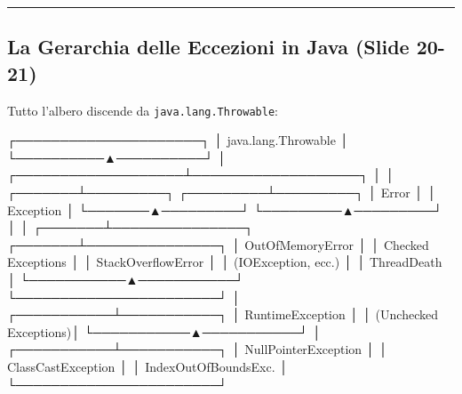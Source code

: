 \documentclass[11pt,a4paper,oneside]{report}
\newcommand{\passthrough}[1]{#1}
\begin{document}
\begin{center}\rule{0.5\linewidth}{0.5pt}\end{center}

\subsection{La Gerarchia delle Eccezioni in Java (Slide
20-21)}\label{chap16_la-gerarchia-delle-eccezioni-in-java-slide-20-21}

Tutto l'albero discende da
\passthrough{\lstinline!java.lang.Throwable!}:

\needspace{7cm}
\begin{asciibox}
                 ┌─────────────────────┐
                 │ java.lang.Throwable │
                 └──────────▲──────────┘
                            │
        ┌───────────────────┴───────────────────┐
        │                                       │
┌───────┴─────────┐                   ┌─────────┴─────────┐
│      Error      │                   │     Exception     │
└───────▲─────────┘                   └─────────▲─────────┘
        │                                       │
┌───────┴───────────────┐               ┌───────┴───────────────┐
│  OutOfMemoryError     │               │  Checked Exceptions   │
│  StackOverflowError   │               │ (IOException, ecc.)   │
│  ThreadDeath          │               └───────────▲───────────┘
└───────────────────────┘                           │
                                        ┌───────────┴───────────┐
                                        │   RuntimeException    │
                                        │ (Unchecked Exceptions)│
                                        └───────────▲───────────┘
                                                    │
                                        ┌───────────┴───────────┐
                                        │ NullPointerException  │
                                        │ ClassCastException    │
                                        │ IndexOutOfBoundsExc.  │
                                        └───────────────────────┘
\end{asciibox}
\end{document}
